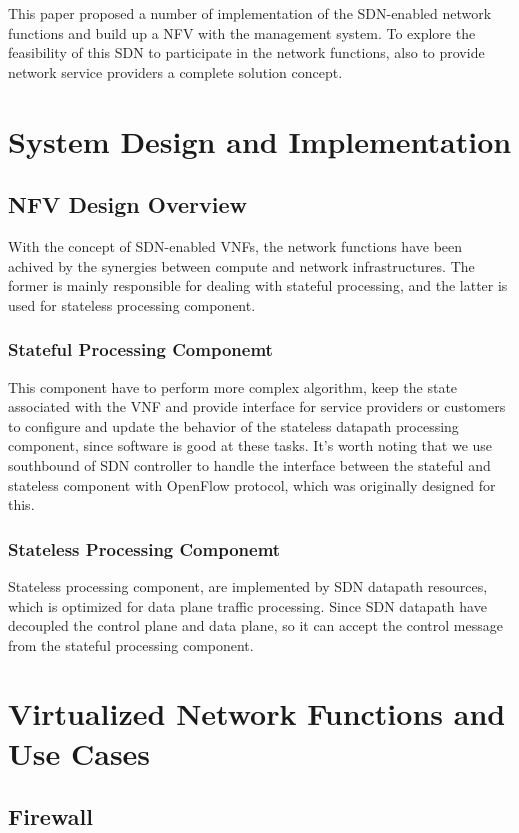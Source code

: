 This paper proposed a number of implementation of the SDN-enabled network functions and build up a NFV with the management system. To explore the feasibility of this SDN to participate in the network functions, also to provide network service providers a complete solution concept.


\section{System Design and Implementation}

\subsection{NFV Design Overview}
With the concept of SDN-enabled VNFs, the network functions have been achived by the synergies between compute and network infrastructures. The former is mainly responsible for dealing with stateful processing, and the latter is used for stateless processing component.
  \subsubsection{Stateful Processing Componemt}
    This component have to perform more complex algorithm, keep the state associated with the VNF and provide interface for service providers or customers to configure and update the behavior of the stateless datapath processing component, since software is good at these tasks. It's worth noting that we use southbound of SDN controller to handle the interface between the stateful and stateless component with OpenFlow protocol, which was originally designed for this.
  \subsubsection{Stateless Processing Componemt}
    Stateless processing component, are implemented by SDN datapath resources, which is optimized for data plane traffic processing. Since SDN datapath have decoupled the control plane and data plane, so it can accept the control message from the stateful processing component.


\section{Virtualized Network Functions and Use Cases}


\subsection{Firewall}
